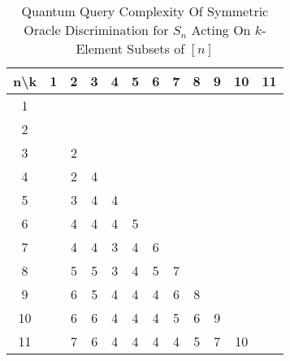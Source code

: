 \documentclass[12pt,twoside]{reedthesis}
\theoremstyle{plain}   %
\theoremstyle{definition}
\theoremstyle{remark}
\numberwithin{equation}{section}
\begin{document}
  \begin{table}[htbp]
\caption[Quantum Query Complexity Of Symmetric Oracle Discrimination for $S_n$ Acting On $k$-Element Subsets of ${[n]}$]{Quantum Query Complexity Of Symmetric Oracle Discrimination for $S_n$ Acting On $k$-Element Subsets of ${[n]}$} 
\begin{center} 
\begin{tabular}{c  c c c c c c c c c c c} 
\toprule %
  n\textbackslash k &  1 & 2 & 3 & 4 & 5 & 6 & 7 & 8 & 9 & 10 & 11\\ %
  \midrule %
        1 & ~ & ~ & ~ & ~ & ~ & ~ & ~ & ~ & ~ & ~ & ~ \\ 
        2 & ~ & ~ & ~ & ~ & ~ & ~ & ~ & ~ & ~ & ~ & ~ \\ 
        3 & ~ & 2 & ~ & ~ & ~ & ~ & ~ & ~ & ~ & ~ & ~ \\ 
        4 & ~ & 2 & 4 & ~ & ~ & ~ & ~ & ~ & ~ & ~ & ~ \\ 
        5 & ~ & 3 & 4 & 4 & ~ & ~ & ~ & ~ & ~ & ~ & ~ \\ 
        6 & ~ & 4 & 4 & 4 & 5 & ~ & ~ & ~ & ~ & ~ & ~ \\ 
        7 & ~ & 4 & 4 & 3 & 4 & 6 & ~ & ~ & ~ & ~ & ~ \\ 
        8 & ~ & 5 & 5 & 3 & 4 & 5 & 7 & ~ & ~ & ~ & ~ \\ 
        9 & ~ & 6 & 5 & 4 & 4 & 4 & 6 & 8 & ~ & ~ & ~ \\ 
        10 & ~ & 6 & 6 & 4 & 4 & 4 & 5 & 6 & 9 & ~ & ~ \\ 
        11 & ~ & 7 & 6 & 4 & 4 & 4 & 4 & 5 & 7 & 10 & ~ \\ 

\end{tabular}
\end{center}
\end{table}
\end{document}
